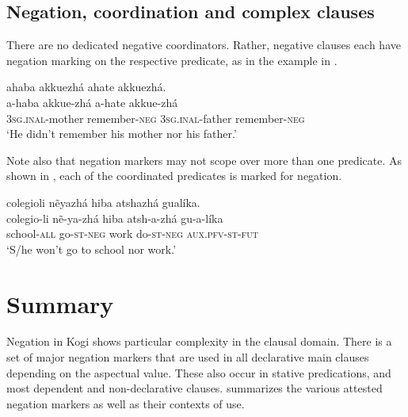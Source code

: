 \documentclass[output=paper,colorlinks,citecolor=brown]{langscibook}
\begin{document}
\subsection{Negation, coordination and complex clauses}\label{sec:kog:4.5}

There are no dedicated negative coordinators. Rather, negative clauses each have negation marking on the respective predicate, as in the example in .

\ea\label{ex:kog:67} ahaba akkuezhá ahate akkuezhá.\\
    \gll  a{}-haba akkue{}-zhá a{}-hate akkue{}-zhá\\ 
           \textsc{3sg.inal-}mother remember-\textsc{neg} \textsc{3sg.inal-}father remember-\textsc{neg}\\
    \glt ‘He didn’t remember his mother nor his father.’
\z 

Note also that negation markers may not scope over more than one predicate. As shown in , each of the coordinated predicates is marked for negation.

\ea\label{ex:kog:68}  colegioli nẽyazhá hiba atshazhá gualíka.\\
    \gll  colegio{}-li nẽ{}-ya{}-zhá hiba atsh{}-a{}-zhá gu{}-a{}-líka\\ 
           school-\textsc{all} go-\textsc{st-neg} work do-\textsc{st-neg} \textsc{aux.pfv-st-fut}\\
    \glt  ‘S/he won’t go to school nor work.’
\z 

\section{Summary}\label{sec:kog:5}
Negation in Kogi shows particular complexity in the clausal domain. There is a set of major negation markers that are used in all declarative main clauses depending on the aspectual value. These also occur in stative predications, and most dependent and non-declarative clauses.
 summarizes the various attested negation markers as well as their contexts of use.
\end{document}
